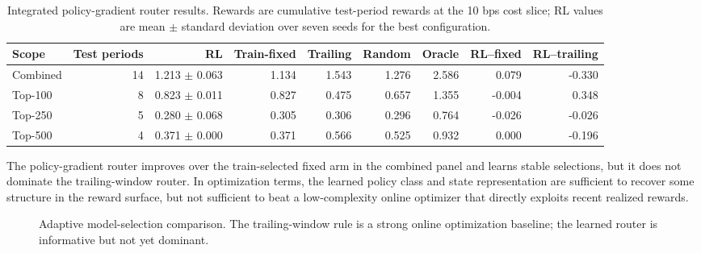 \documentclass[journal,10pt]{IEEEtran}
\begin{document}
\begin{table}[!t]
\centering
\caption{Integrated policy-gradient router results. Rewards are cumulative test-period rewards at the 10 bps cost slice; RL values are mean $\pm$ standard deviation over seven seeds for the best configuration.}
\label{tab:rl_math}
\scriptsize
\begin{tabular}{lrrrrrrrr}
\toprule
Scope & Test periods & RL & Train-fixed & Trailing & Random & Oracle & RL--fixed & RL--trailing\\
\midrule
Combined & 14 & 1.213 $\pm$ 0.063 & 1.134 & 1.543 & 1.276 & 2.586 & 0.079 & -0.330\\
Top-100 & 8 & 0.823 $\pm$ 0.011 & 0.827 & 0.475 & 0.657 & 1.355 & -0.004 & 0.348\\
Top-250 & 5 & 0.280 $\pm$ 0.068 & 0.305 & 0.306 & 0.296 & 0.764 & -0.026 & -0.026\\
Top-500 & 4 & 0.371 $\pm$ 0.000 & 0.371 & 0.566 & 0.525 & 0.932 & 0.000 & -0.196\\
\bottomrule
\end{tabular}
\end{table}
The policy-gradient router improves over the train-selected fixed arm in the combined panel and learns stable selections, but it does not dominate the trailing-window router. In optimization terms, the learned policy class and state representation are sufficient to recover some structure in the reward surface, but not sufficient to beat a low-complexity online optimizer that directly exploits recent realized rewards.

\begin{figure}[!t]
\centering
{}
\caption{Adaptive model-selection comparison. The trailing-window rule is a strong online optimization baseline; the learned router is informative but not yet dominant.}
\label{fig:rl_math_bar}
\end{figure}
\end{document}
